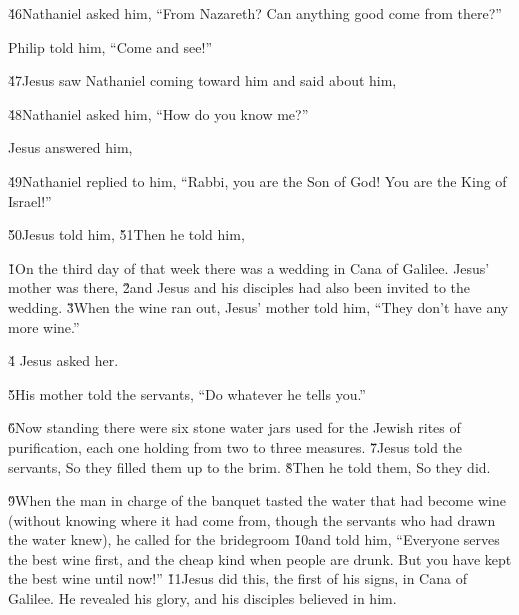 \v{46}Nathaniel asked him, ``From Nazareth? Can anything good come from there?''

Philip told him, ``Come and see!''

\v{47}Jesus saw Nathaniel coming toward him and said about him, 

\v{48}Nathaniel asked him, ``How do you know me?''

Jesus answered him, 

\v{49}Nathaniel replied to him, ``Rabbi, you are the Son of God! You are the King of Israel!''

\v{50}Jesus told him,  \v{51}Then he told him, 

\v{1}On the third day of that week there was a wedding in Cana of Galilee. Jesus' mother was there, \v{2}and Jesus and his disciples had also been invited to the wedding. \v{3}When the wine ran out, Jesus' mother told him, ``They don't have any more wine.''

\v{4} Jesus asked her.

\v{5}His mother told the servants, ``Do whatever he tells you.''

\v{6}Now standing there were six stone water jars used for the Jewish rites of purification, each one holding from two to three measures. \v{7}Jesus told the servants,  So they filled them up to the brim. \v{8}Then he told them,  So they did.

\v{9}When the man in charge of the banquet tasted the water that had become wine (without knowing where it had come from, though the servants who had drawn the water knew), he called for the bridegroom \v{10}and told him, ``Everyone serves the best wine first, and the cheap kind when people are drunk. But you have kept the best wine until now!'' \v{11}Jesus did this, the first of his signs, in Cana of Galilee. He revealed his glory, and his disciples believed in him.

